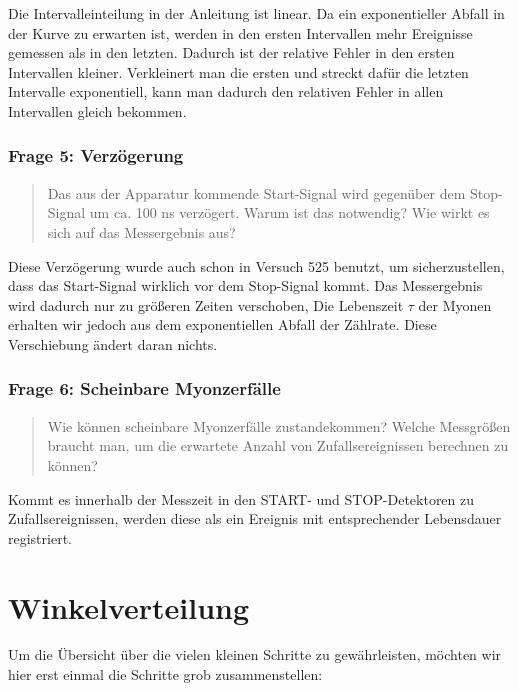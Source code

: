 \documentclass[11pt, ngerman, fleqn, DIV=15, headinclude, BCOR=2cm]{scrreprt}
\begin{document}
Die Intervalleinteilung in der Anleitung ist linear. Da ein exponentieller
Abfall in der Kurve zu erwarten ist, werden in den ersten Intervallen mehr
Ereignisse gemessen als in den letzten. Dadurch ist der relative Fehler in den
ersten Intervallen kleiner. Verkleinert man die ersten und streckt dafür die
letzten Intervalle exponentiell, kann man dadurch den relativen Fehler in allen
Intervallen gleich bekommen.

\subsection{Frage 5: Verzögerung}

\begin{quote}
    Das aus der Apparatur kommende Start-Signal wird gegenüber dem Stop-Signal
    um ca. 100 ns verzögert. Warum ist das notwendig? Wie wirkt es sich auf das
    Messergebnis aus?
\end{quote}

Diese Verzögerung wurde auch schon in Versuch 525 benutzt, um sicherzustellen,
dass das Start-Signal wirklich vor dem Stop-Signal kommt. Das Messergebnis wird
dadurch nur zu größeren Zeiten verschoben, Die Lebenszeit $\tau$ der Myonen
erhalten wir jedoch aus dem exponentiellen Abfall der Zählrate. Diese
Verschiebung ändert daran nichts.

\subsection{Frage 6: Scheinbare Myonzerfälle}

\begin{quote}
    Wie können scheinbare Myonzerfälle zustandekommen? Welche Messgrößen
    braucht man, um die erwartete Anzahl von Zufallsereignissen berechnen zu
    können?
\end{quote}

Kommt es innerhalb der Messzeit in den START- und STOP-Detektoren zu
Zufallsereignissen, werden diese als ein Ereignis mit entsprechender
Lebensdauer registriert.


\chapter{Winkelverteilung}

Um die Übersicht über die vielen kleinen Schritte zu gewährleisten, möchten wir
hier erst einmal die Schritte grob zusammenstellen:
\end{document}
